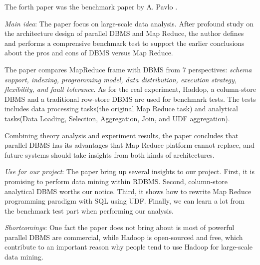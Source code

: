 The forth paper was the benchmark paper by A. Pavlo \cite{pavlo09}.
\begin{itemize*}
\item {\em Main idea}:
	   The paper focus on large-scale data analysis. After profound study on the architecture design of parallel DBMS and Map Reduce, the author defines and performs a comprensive benchmark test to support the earlier conclusions about the pros and cons of DBMS versus Map Reduce. 

	   The paper compares MapReduce frame with DBMS from 7 perspectives: {\em schema support, indexing, programming model, data distribution, execution strategy, flexibility, and fault tolerance}. As for the real experiment, Haddop, a column-store DBMS and a traditional row-store DBMS are used for benchmark tests. The tests includes data processing tasks(the original Map Reduce task) and analytical tasks(Data Loading, Selection, Aggregation, Join, and UDF aggregation). 

	   Combining theory analysis and experiment results, the paper concludes that parallel DBMS has its advantages that Map Reduce platform cannot replace, and future systems should take insights from both kinds of architectures.
\item {\em Use for our project}:
	   The paper bring up several insights to our project. First, it is promising to perform data mining within RDBMS. Second, column-store analytical DBMS worths our notice. Third, it shows how to rewrite Map Reduce programming paradigm with SQL using UDF. Finally, we can learn a lot from the benchmark test part when performing our analysis. 
\item {\em Shortcomings}:
       One fact the paper does not bring about is most of powerful parallel DBMS are commercial, while Hadoop is open-sourced and free,
       which contribute to an important reason why people tend to use Hadoop for large-scale data mining.
\end{itemize*}

